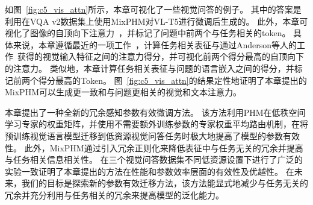 如图~\ref{fig:c5_vis_attn}所示，本章可视化了一些视觉问答的例子。
其中的答案是利用在VQA v2数据集上使用MixPHM对VL-T5进行微调后生成的。
此外，本章可视化了图像的自顶向下注意力~\cite{anderson2018bottom}，并标记了问题中前两个与任务相关的token。
具体来说，本章遵循最近的一项工作~\cite{jiang2022finetuning}，计算任务相关表征与通过Anderson等人的工作~\cite{anderson2018bottom}获得的视觉输入特征之间的注意力得分，并可视化前两个得分最高的自顶向下的注意力。
类似地，本章计算任务相关表征与问题的语言嵌入之间的得分，并标记前两个得分最高的Token。
图~\ref{fig:c5_vis_attn}的结果定性地证明了本章提出的MixPHM可以生成更一致和与问题更相关的视觉和文本注意力。




本章提出了一种全新的冗余感知参数有效微调方法。
该方法利用PHM在低秩空间学习专家的权重矩阵，并使用不需要额外训练参数的专家权重平均路由机制，在将预训练视觉语言模型迁移到低资源视觉问答任务时极大地提高了模型的参数有效性。
此外，MixPHM通过引入冗余正则化来降低表征中与任务无关的冗余并提高与任务相关信息相关性。
在三个视觉问答数据集不同低资源设置下进行了广泛的实验一致证明了本章提出的方法在性能和参数效率层面的有效性及优越性。
在未来，我们的目标是探索新的参数有效迁移方法，该方法能显式地减少与任务无关的冗余并充分利用与任务相关的冗余来提高模型的泛化能力。


